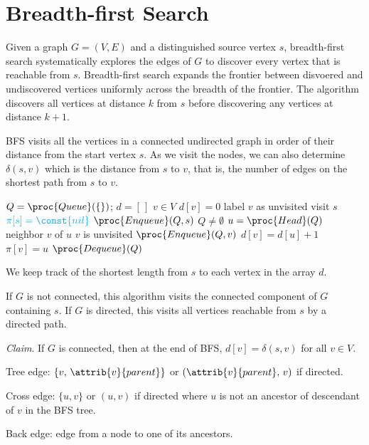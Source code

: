 \section{Breadth-first Search} 

Given a graph $G=(V,E)$ and a distinguished source vertex $s$, breadth-first search systematically explores the edges of $G$ to discover every vertex that is reachable from $s$. Breadth-first search expands the frontier between disvoered and undiscovered vertices uniformly across the breadth of the frontier. The algorithm discovers all vertices at distance $k$ from $s$ before discovering any vertices at distance $k+1$.

BFS visits all the vertices in a connected undirected graph in order of their distance from the start vertex $s$. As we visit the nodes, we can also determine $\delta(s,v)$ which is the distance from $s$ to $v$, that is, the number of edges on the shortest path from $s$ to $v$.

\begin{codebox}
    \li $Q = \proc{Queue}(\{\})$;\; $d = [ \, ]$ 
    \li \For $v \in V$ \Do
        \li $d[v] = 0$ 
        \li label $v$ as unvisited \End
    \li visit $s$
    \li $\color{cyan} \pi[s] = \const{nil}$ 
    \li $\proc{Enqueue}(Q,s)$
    \li \While $Q \neq \emptyset$ \Do
        \li $u = \proc{Head}(Q)$
        \li {} neighbor $v$ of $u$ \Do
            \li \If $v$ is unvisited \Then
                \li $\proc{Enqueue}(Q,v)$
                \li $d[v] = d[u] + 1$
                \li \color{cyan} $\pi[v] = u$  \End
            \End
        \li $\proc{Dequeue}(Q)$
\end{codebox}

We keep track of the shortest length from $s$ to each vertex in the array $d$.

If $G$ is not connected, this algorithm visits the connected component of $G$ containing $s$. If $G$ is directed, this visits all vertices reachable from $s$ by a directed path.

\textit{Claim}. If $G$ is connected, then at the end of BFS, $d[v] = \delta(s,v)$ for all $v \in V$.

Tree edge: $\{v,\, \attrib{v}{parent}\}$ or $(\attrib{v}{parent},\, v)$ if directed.

Cross edge: $\{ u,v \}$ or $(u,v)$ if directed where $u$ is not an ancestor of descendant of $v$ in the BFS tree.

Back edge: edge from a node to one of its ancestors.

